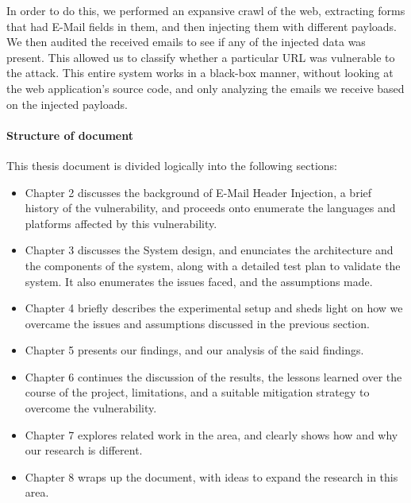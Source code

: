 	In order to do this, we performed an expansive crawl of the web, extracting forms that had E-Mail fields in them, and then injecting them with different payloads. We then audited the received emails to see if any of the injected data was present. This allowed us to classify whether a particular URL was vulnerable to the attack. This entire system works in a black-box manner, without looking at the web application's source code, and only analyzing the emails we receive based on the injected payloads.

\paragraph{Structure of document} %
This thesis document is divided logically into the following sections:
\begin{itemize}
	\item Chapter 2 discusses the background of E-Mail Header Injection, a brief history of the vulnerability, and proceeds onto enumerate the languages and platforms affected by this vulnerability.%
	
	\item Chapter 3 discusses the System design, and enunciates the architecture and the components of the system, along with a detailed test plan to validate the system. It also enumerates the issues faced, and the assumptions made.
	
	\item Chapter 4 briefly describes the experimental setup and sheds light on how we overcame the issues and assumptions discussed in the previous section.
	
	\item Chapter 5 presents our findings, and our analysis of the said findings.
	
	\item Chapter 6 continues the discussion of the results, the lessons learned over the course of the project, limitations, and a suitable mitigation strategy to overcome the vulnerability.
	
	\item Chapter 7 explores related work in the area, and clearly shows how and why our research is different.
	
	\item Chapter 8 wraps up the document, with ideas to expand the research in this area.
\end{itemize} 


